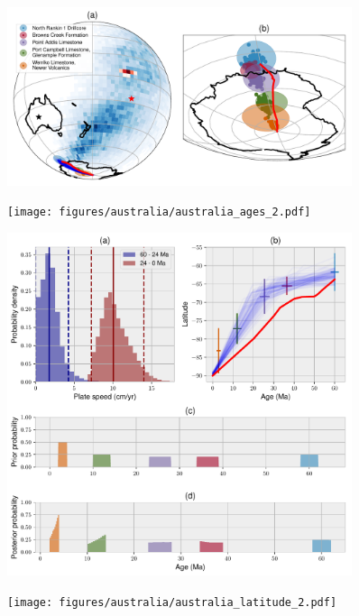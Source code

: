 \documentclass[preprint,12pt,authoryear]{elsarticle}
\begin{document}
\begin{figure}
\includegraphics[width=0.9\textwidth]{figures/australia/australia_paths_2.pdf}
\caption{}
\label{fig:australia_paths_2}
\end{figure}
\begin{figure}
\texttt{[image: figures/australia/australia\_ages\_2.pdf]}
\caption{}
\label{fig:australia_ages_2}
\end{figure}
\begin{figure}
\includegraphics[width=0.9\textwidth]{figures/australia/australia_speeds_2.pdf}
\caption{}
\label{fig:australia_speeds_2}
\end{figure}
\begin{figure}
\texttt{[image: figures/australia/australia\_latitude\_2.pdf]}
\caption{}
\label{fig:australia_latitude_2}
\end{figure}
\end{document}
